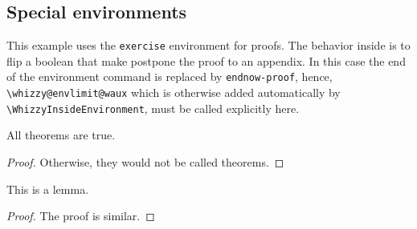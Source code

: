 \documentclass{article}
\newenvironment{drawer}[1]{\subsection{#1}}{}
\begin{document}
\begin{drawer}{Special environments}
This example uses the \verb"exercise" environment for proofs.
The behavior inside is to flip a boolean that make postpone the proof to an
appendix. In this case the end of the environment command is replaced
by \verb"endnow-proof", hence, 
\verb"\whizzy@envlimit@waux" which is otherwise added automatically by
\verb"\WhizzyInsideEnvironment", must be called explicitly here.
\begin{theorem}
All theorems are true.
\end{theorem}
\begin{proof}{}
Otherwise, they would not be called theorems. 
\end{proof}
\begin{lemma}
This is a lemma. 
\end{lemma}
\begin{proof}{}
The proof is similar.
\end{proof}
\end{drawer}

\newpage
\appendix

\end{document}
